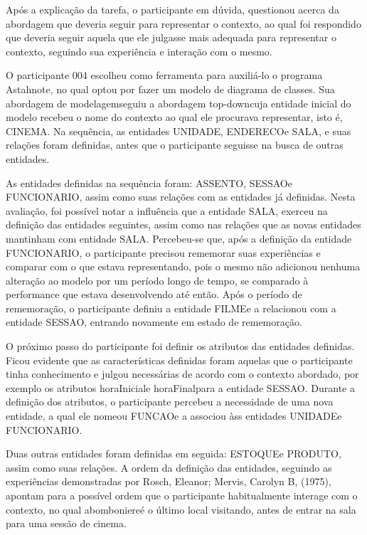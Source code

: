 Após a explicação da tarefa, o participante em dúvida, questionou acerca da abordagem que deveria seguir para representar o contexto, ao qual foi respondido que deveria seguir aquela que ele julgasse mais adequada para representar o contexto, seguindo sua experiência e interação com o mesmo.

O participante 004 escolheu como ferramenta para auxiliá-lo o programa Astahnote, no qual optou por fazer um modelo de diagrama de classes. Sua abordagem de modelagemseguiu a abordagem top-downcuja entidade inicial do modelo recebeu o nome do contexto ao qual ele procurava representar, isto é, CINEMA. Na sequência, as entidades UNIDADE, ENDERECOe SALA, e suas relações foram definidas, antes que o participante seguisse na busca de outras entidades.

As entidades definidas na sequência foram: ASSENTO, SESSAOe FUNCIONARIO, assim como suas relações com as entidades já definidas. Nesta avaliação, foi possível notar a influência que a entidade SALA, exerceu na definição das entidades seguintes, assim como nas relações que as novas entidades mantinham com entidade SALA. Percebeu-se que, após a definição da entidade FUNCIONARIO, o participante precisou rememorar suas experiências e comparar com o que estava representando, pois o mesmo não adicionou nenhuma alteração ao modelo por um período longo de tempo, se comparado à performance que estava desenvolvendo até então. Após o período de rememoração, o participante definiu a entidade FILMEe a relacionou com a entidade SESSAO, entrando novamente em estado de rememoração.

O próximo passo do participante foi definir os atributos das entidades definidas. Ficou evidente que as características definidas foram aquelas que o participante tinha conhecimento e julgou necessárias de acordo com o contexto abordado, por exemplo os atributos horaIniciale horaFinalpara a entidade SESSAO. Durante a definição dos atributos, o participante percebeu a necessidade de uma nova entidade, a qual ele nomeou FUNCAOe a associou àss entidades UNIDADEe FUNCIONARIO.

Duas outras entidades foram definidas em seguida: ESTOQUEe PRODUTO, assim como suas relações. A ordem da definição das entidades, seguindo as experiências demonstradas por Rosch, Eleanor; Mervis, Carolyn B, (1975), apontam para a possível ordem que o participante habitualmente interage com o contexto, no qual abomboniereé o último local visitando, antes de entrar na sala para uma sessão de cinema.


